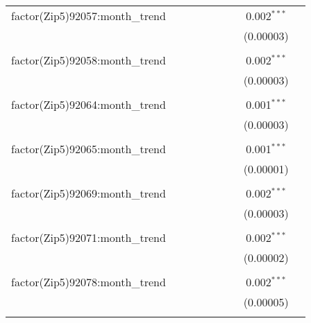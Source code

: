 \begin{table}[H]
{\begin{tabular}{@{\extracolsep{5pt}}lcccccccc}
  factor(Zip5)92057:month\_trend &  &  &  &  &  &  & 0.002$^{***}$ &  \\  

   &  &  &  &  &  &  & (0.00003) &  \\  

   & & & & & & & & \\  

  factor(Zip5)92058:month\_trend &  &  &  &  &  &  & 0.002$^{***}$ &  \\  

   &  &  &  &  &  &  & (0.00003) &  \\  

   & & & & & & & & \\  

  factor(Zip5)92064:month\_trend &  &  &  &  &  &  & 0.001$^{***}$ &  \\  

   &  &  &  &  &  &  & (0.00003) &  \\  

   & & & & & & & & \\  

  factor(Zip5)92065:month\_trend &  &  &  &  &  &  & 0.001$^{***}$ &  \\  

   &  &  &  &  &  &  & (0.00001) &  \\  

   & & & & & & & & \\  

  factor(Zip5)92069:month\_trend &  &  &  &  &  &  & 0.002$^{***}$ &  \\  

   &  &  &  &  &  &  & (0.00003) &  \\  

   & & & & & & & & \\  

  factor(Zip5)92071:month\_trend &  &  &  &  &  &  & 0.002$^{***}$ &  \\  

   &  &  &  &  &  &  & (0.00002) &  \\  

   & & & & & & & & \\  

  factor(Zip5)92078:month\_trend &  &  &  &  &  &  & 0.002$^{***}$ &  \\  

   &  &  &  &  &  &  & (0.00005) &  \\  

   & & & & & & & & \\  


\end{tabular}}
\end{table}
